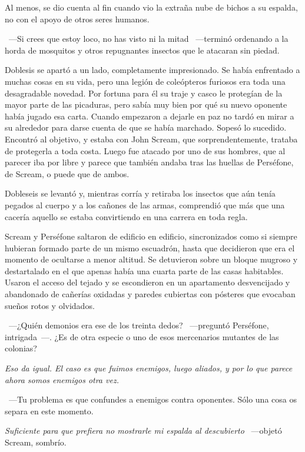 Al menos, se dio cuenta al fin cuando vio la extraña nube de bichos a su espalda, no con el apoyo de otros seres humanos.

~---Si crees que estoy loco, no has visto ni la mitad ~---terminó ordenando a la horda de mosquitos y otros repugnantes insectos que le atacaran sin piedad.

Doblesis se apartó a un lado, completamente impresionado. Se había enfrentado a muchas cosas en su vida, pero una legión de coleópteros furiosos era toda una desagradable novedad. Por fortuna para él su traje y casco le protegían de la mayor parte de las picaduras, pero sabía muy bien por qué su nuevo oponente había jugado esa carta. Cuando empezaron a dejarle en paz no tardó en mirar a su alrededor para darse cuenta de que se había marchado. Sopesó lo sucedido. Encontró al objetivo, y estaba con John Scream, que sorprendentemente, trataba de protegerla a toda costa. Luego fue atacado por uno de sus hombres, que al parecer iba por libre y parece que también andaba tras las huellas de Perséfone, de Scream, o puede que de ambos.

Dobleseis se levantó y, mientras corría y retiraba los insectos que aún tenía pegados al cuerpo y a los cañones de las armas, comprendió que más que una cacería aquello se estaba convirtiendo en una carrera en toda regla.

\parbreak
Scream y Perséfone saltaron de edificio en edificio, sincronizados como si siempre hubieran formado parte de un mismo escuadrón, hasta que decidieron que era el momento de ocultarse a menor altitud. Se detuvieron sobre un bloque mugroso y destartalado en el que apenas había una cuarta parte de las casas habitables. Usaron el acceso del tejado y se escondieron en un apartamento desvencijado y abandonado de cañerías oxidadas y paredes cubiertas con pósteres que evocaban sueños rotos y olvidados.

~---¿Quién demonios era ese de los treinta dedos? ~---preguntó Perséfone, intrigada~---. ¿Es de otra especie o uno de esos mercenarios mutantes de las colonias?

\emph{Eso da igual. El caso es que fuimos enemigos, luego aliados, y por lo que parece ahora somos enemigos otra vez.}

~---Tu problema es que confundes a enemigos contra oponentes. Sólo una cosa os separa en este momento.

\emph{Suficiente para que prefiera no mostrarle mi espalda al descubierto} ~---objetó Scream, sombrío.

